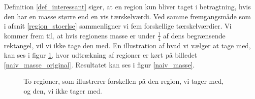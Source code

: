 Definition \ref{def_interessant} siger, at en region kun bliver taget i
betragtning, hvis den har en masse større end en vis tærskelværdi.
Ved samme fremgangsmåde som i afsnit \ref{region_stoerlse} sammenligner vi fem
forskellige tærskelværdier. Vi kommer frem til, at hvis regionens masse er
under $\frac{1}{4}$ af dens begrænsende rektangel, vil vi ikke tage den med. En
illustration af hvad vi vælger at tage med, kan ses i figur \ref{masse}, hvor
udtrækning af regioner er kørt på billedet \ref{naiv_masse_original}. 
Resultatet kan ses i figur \ref{naiv_masse}.

\begin{figure}[!h]
    \centering
    \hspace{1em}
    \caption{To regioner, som illustrerer forskellen på den region, vi
	tager med, og den, vi ikke tager med.}
	\label{masse}
\end{figure}

